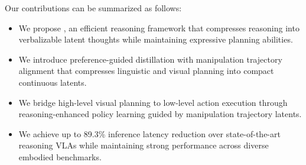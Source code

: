 Our contributions can be summarized as follows:
\begin{itemize}
    \item We propose \textit{\ours{}}, an efficient reasoning framework that compresses reasoning into verbalizable latent thoughts while maintaining expressive planning abilities.
    
    \item We introduce preference-guided distillation with manipulation trajectory alignment that compresses linguistic and visual planning into compact continuous latents.
    
    \item We bridge high-level visual planning to low-level action execution through reasoning-enhanced policy learning guided by manipulation trajectory latents.
    
    \item We achieve up to 89.3\% inference latency reduction over state-of-the-art reasoning VLAs while maintaining strong performance across diverse embodied benchmarks.
\end{itemize}